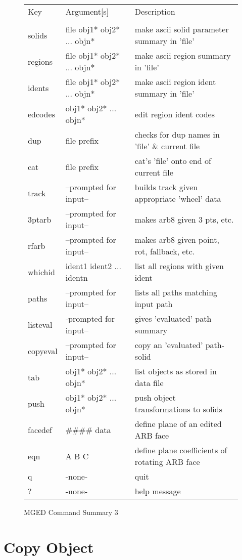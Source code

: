 \begin{figure}
\begin{tabular}{l l l}
Key	& Argument[s]	& Description \\
\\
  solids	& file obj1* obj2* ... objn*	& make ascii solid parameter summary in 'file' \\
  regions	& file obj1* obj2* ... objn*	& make ascii region summary in 'file' \\
  idents	& file obj1* obj2* ... objn*	& make ascii region ident summary in 'file' \\
  edcodes	& obj1* obj2* ... objn*	& edit region ident codes \\
  dup	& file {prefix}	& checks for dup names in 'file' \& current file \\
  cat	& file {prefix}	& cat's 'file' onto end of current file \\
  track	& --prompted for input--	& builds track given appropriate 'wheel' data \\
  3ptarb	& --prompted for input--	& makes arb8 given 3 pts, etc. \\
  rfarb	& --prompted for input--	& makes arb8 given point, rot, fallback, etc. \\
  whichid	& ident1 ident2 ... identn	& list all regions with given ident \\
  paths	& --prompted for input--	& lists all paths matching input path \\
  listeval	& -prompted for input--	& gives 'evaluated' path summary \\
  copyeval	& --prompted for input--	& copy an 'evaluated' path-solid \\
  tab	& obj1* obj2* ... objn*	& list objects as stored in data file \\
  push	& obj1* obj2* ... objn*	& push object transformations to solids \\
  facedef	& \#\#\#\# {data}	& define plane of an edited ARB face \\
  eqn	& A B C	& define plane coefficients of rotating ARB face \\
  q	& -none-	& quit \\
  ?	& -none-	& help message \\
\end{tabular}
\caption{MGED Command Summary 3 }
\end{figure}

\section{Copy Object}

